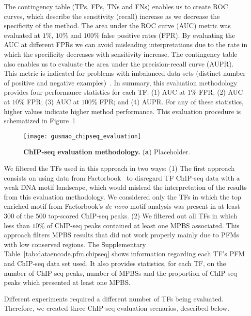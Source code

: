 The contingency table (TPs, FPs, TNs and FNs) enables us to create ROC curves, which describe the sensitivity (recall) increase as we decrease the specificity of the method. The area under the ROC curve (AUC) metric was evaluated at $1\%$, $10\%$ and $100\%$ false positive rates (FPR). By evaluating the AUC at different FPRs we can avoid misleading interpretations due to the rate in which the specificity decreases with sensitivity increase. The contingency table also enables us to evaluate the area under the precision-recall curve (AUPR). This metric is indicated for problems with imbalanced data sets (distinct number of positive and negative examples)~\cite{davis2006,fawcett2006}. In summary, this evaluation methodology provides four performance statistics for each TF: (1) AUC at $1\%$ FPR; (2) AUC at $10\%$ FPR; (3) AUC at $100\%$ FPR; and (4) AUPR. For any of these statistics, higher values indicate higher method performance. This evaluation procedure is schematized in Figure~\ref{fig:gusmao_chipseq_evaluation}

\begin{figure}[h!]
\centering
\texttt{[image: gusmao\_chipseq\_evaluation]}
\caption[ChIP-seq evaluation methodology]{\textbf{ChIP-seq evaluation methodology.} (\textbf{a}) Placeholder.}
\label{fig:gusmao_chipseq_evaluation}
\end{figure}

We filtered the TFs used in this approach in two ways: (1) The first approach consists on using data from Factorbook~\cite{wang2013} to disregard TF ChIP-seq data with a weak DNA motif landscape, which would mislead the interpretation of the results from this evaluation methodology. We considered only the TFs in which the top enriched motif from Factorbook's \emph{de novo} motif analysis was present in at least $300$ of the $500$ top-scored ChIP-seq peaks. (2) We filtered out all TFs in which less than $10\%$ of ChIP-seq peaks contained at least one MPBS associated. This approach filters MPBS results that did not work properly mainly due to PFMs with low conserved regions. The Supplementary Table~\ref{tab:dataencode.pfm.chipseq} shows information regarding each TF's PFM and ChIP-seq data set used. It also provides statistics, for each TF, on the number of ChIP-seq peaks, number of MPBSs and the proportion of ChIP-seq peaks which presented at least one MPBS.

Different experiments required a different number of TFs being evaluated. Therefore, we created three ChIP-seq evaluation scenarios, described below.

